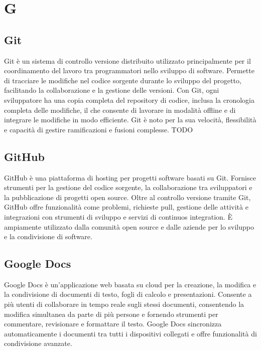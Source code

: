 \section{G}

\vspace{2em}
\subsection*{Git}
Git è un sistema di controllo versione distribuito utilizzato principalmente per il coordinamento del lavoro tra programmatori nello sviluppo di software. Permette di tracciare le modifiche nel codice sorgente durante lo sviluppo del progetto, facilitando la collaborazione e la gestione delle versioni. Con Git, ogni sviluppatore ha una copia completa del repository di codice, inclusa la cronologia completa delle modifiche, il che consente di lavorare in modalità offline e di integrare le modifiche in modo efficiente. Git è noto per la sua velocità, flessibilità e capacità di gestire ramificazioni e fusioni complesse.
TODO

\vspace{2em}
\subsection*{GitHub}
GitHub è una piattaforma di hosting per progetti software basati su Git. Fornisce strumenti per la gestione del codice sorgente, la collaborazione tra sviluppatori e la pubblicazione di progetti open source. Oltre al controllo versione tramite Git, GitHub offre funzionalità come problemi, richieste pull, gestione delle attività e integrazioni con strumenti di sviluppo e servizi di continuos integration. È ampiamente utilizzato dalla comunità open source e dalle aziende per lo sviluppo e la condivisione di software.

\vspace{2em}
\subsection*{Google Docs}
Google Docs è un'applicazione web basata su cloud per la creazione, la modifica e la condivisione di documenti di testo, fogli di calcolo e presentazioni. Consente a più utenti di collaborare in tempo reale sugli stessi documenti, consentendo la modifica simultanea da parte di più persone e fornendo strumenti per commentare, revisionare e formattare il testo. Google Docs sincronizza automaticamente i documenti tra tutti i dispositivi collegati e offre funzionalità di condivisione avanzate.

